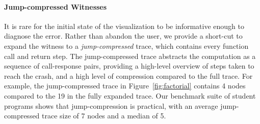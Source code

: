 \paragraph{Jump-compressed Witnesses}
It is rare for the initial state of the visualization to be
informative enough to diagnose the error.
%
Rather than abandon the user, we provide a short-cut to expand the witness
to a \emph{jump-compressed} trace, which contains every function call
and return step.
%
The jump-compressed trace abstracts the computation as a sequence of
call-response pairs, providing a high-level overview of steps taken
to reach the crash, and a high level of compression compared to the
full trace.
%
For example, the jump-compressed trace in Figure~\ref{fig:factorial}
contains 4 nodes compared to the 19 in the fully expanded trace.
%
Our benchmark suite of student programs shows that jump-compression is
practical, with an average jump-compressed trace size of 7 nodes and a
median of 5.




